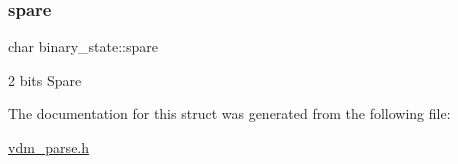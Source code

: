 \subsubsection{\texorpdfstring{spare}{spare}}
{\footnotesize\ttfamily char binary\+\_\+state\+::spare}



2 bits Spare 



The documentation for this struct was generated from the following file\+:\begin{DoxyCompactItemize}
\item 
\mbox{\hyperlink{vdm__parse_8h}{vdm\+\_\+parse.\+h}}\end{DoxyCompactItemize}
